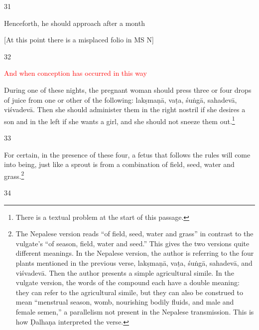 \begin{translation}
        
 \item [31]

Henceforth, he should approach after a month

[At this point there is a misplaced folio in MS N]
  
\item[32] 

\textcolor{red}{And when conception has occurred in this 
way}\q{\textcolor{red}{Problematic 
passage in the edition.}}

During one of these nights, the pregnant woman should press three or
four drops of juice from one or other of the following:
\gls{lakṣmaṇā}, \gls{vaṭa}, \gls{śuṅgā}, \gls{sahadevā},
\gls{viśvadevā}. Then she should administer them in the right nostril if she
desires a son and in the left if she wants a girl, and she should not
sneeze them out.\footnote{There is a textual problem at the start of this 
passage.}




\item[33]

\begin{sloka}
    For certain, in the presence of these four, a fetus that follows
the rules will come into being, just like a sprout is from a
combination of field, seed, water and grass.\footnote{The Nepalese
    version reads  “of field, seed, water
    and grass” in contrast to the vulgate's 
    “of season, field, water and seed.” This gives the two versions
    quite different meanings. In the Nepalese version, the author is
    referring to the four plants mentioned in the previous verse,
    \gls{lakṣmaṇā}, \gls{vaṭa}, \gls{śuṅgā}, \gls{sahadevā}, and
    \gls{viśvadevā}.  Then the author presents a simple agricultural
    simile.  In the vulgate version, the words of the compound each
    have a double meaning: they can refer to the agricultural simile,
    but they can also be construed to mean “menstrual season, womb,
    nourishing bodily fluids, and male and female semen,” a
    parallelism not present in the Nepalese transmission.   This is
    how Ḍalhaṇa interpreted the verse.}
\end{sloka}

\item[34] 


\end{translation}

